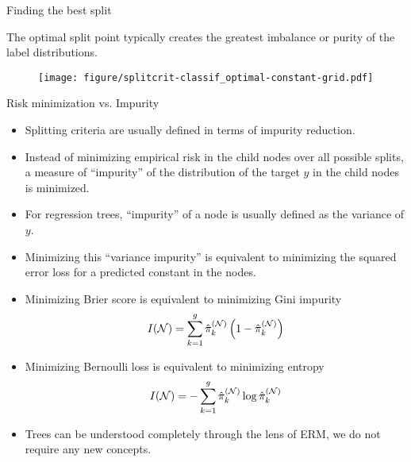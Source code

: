 \documentclass[11pt,compress,t,notes=noshow, xcolor=table]{beamer}
\begin{document}
\begin{frame}[noframenumbering]{Finding the best split}

The optimal split point typically creates the greatest imbalance or purity of the label distributions.

\vspace{0.5cm}

\begin{figure}[b]
    \centering
  \texttt{[image: figure/splitcrit-classif\_optimal-constant-grid.pdf]}
\end{figure}
\end{frame}

\begin{vbframe}{Risk minimization vs. Impurity}

\begin{itemize}
\item Splitting criteria are usually defined in terms of impurity reduction. 
\item Instead of minimizing empirical risk in the child nodes over all possible splits, a measure of \enquote{impurity} of the distribution of the target $y$ in the child nodes is minimized. 
\item For regression trees, \enquote{impurity} of a node is usually defined as the variance of $y$. 
\item Minimizing this \enquote{variance impurity} is equivalent to minimizing the squared error loss for a predicted constant in the nodes. 

\framebreak 

\item Minimizing Brier score is equivalent to minimizing  Gini impurity
$$I(\mathcal{N}) = \sum\limits_{k=1}^g \hat\pi_k^{(\mathcal{N})} \left( 1-\hat\pi_k^{(\mathcal{N})} \right)$$
\item Minimizing Bernoulli loss is equivalent to minimizing entropy
$$I(\mathcal{N}) = -\sum\limits_{k=1}^g \hat\pi_k^{(\mathcal{N})} \log \hat\pi_k^{(\mathcal{N})}$$
\item Trees can be understood completely through the lens of ERM, we do not require any new concepts.
\end{itemize}
\end{vbframe}
\end{document}
